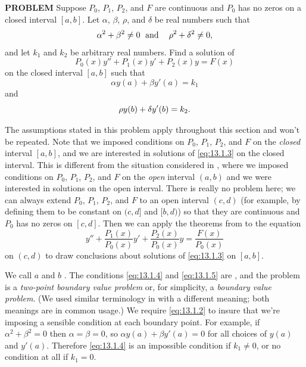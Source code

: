 {\bfseries PROBLEM}\quad
Suppose $P_{0}$, $P_{1}$, $P_{2}$, and $F$ are  continuous and  $P_{0}$
has no zeros on a closed interval $[a,b]$. Let $\alpha$, $\beta$,
$\rho$, and $\delta$ be real numbers such that
\begin{equation} \label{eq:13.1.2}
\alpha^{2}+\beta^{2}\ne 0\text{\;    and\; \;  } \rho^{2}+\delta^{2}\ne 0,
\end{equation}
and let $k_{1}$ and $k_{2}$ be arbitrary real numbers. Find a solution of
\begin{equation} \label{eq:13.1.3}
P_{0}(x)y''+P_{1}(x)y'+P_{2}(x)y=F(x)
\end{equation}
on the closed interval $[a,b]$ such that
\begin{equation} \label{eq:13.1.4}
\alpha y(a)+\beta y'(a)=k_{1}
\end{equation}
and
\begin{equation} \label{eq:13.1.5}
\rho y(b)+\delta y'(b)=k_{2}.\index{second order equation!two-point boundary value problem!defined}\index{two-point boundary value problem!defined}
\end{equation}


\medskip
The
assumptions
stated in this problem apply throughout this section and
won't be repeated. Note that we imposed conditions on $P_{0}$,
$P_{1}$, $P_{2}$, and $F$  on the \emph{closed} interval $[a,b]$, and we
are interested in solutions of \eqref{eq:13.1.3} on the closed interval.
This is different from the situation considered in ,
where we imposed conditions on $P_{0}$, $P_{1}$, $P_{2}$, and $F$  on the
\emph{open} interval $(a,b)$ and we were interested in solutions on the
open interval. There
is really no problem here;   we can always extend  $P_{0}$, $P_{1}$,
$P_{2}$,
and $F$ to an open interval $(c,d)$ (for example, by defining them to be
constant on $(c,d]$ and $[b,d)$) so that they are continuous and $P_{0}$
has no zeros on $[c,d]$. Then we can apply the theorems from
 to the equation
\[
y''+\frac{P_{1}(x)}{P_{0}(x)}y'+
\frac{P_{2}(x)}{P_{0}(x)}y=\frac{F(x)}{P_{0}(x)}
\]
on $(c,d)$ to draw conclusions about solutions of \eqref{eq:13.1.3} on $[a,b]$.

We call $a$ and $b$ .  The conditions \eqref{eq:13.1.4}
and \eqref{eq:13.1.5}  are
,
and the problem is a
\emph{two-point boundary value problem} or, for simplicity, a
\emph{boundary value problem}. (We used  similar terminology in
 with a different meaning; both meanings are in common usage.)
  We require \eqref{eq:13.1.2} to insure that we're imposing a sensible
condition at each boundary point. For example, if $\alpha^{2}+\beta^{2}=0$
then $\alpha=\beta=0$, so $\alpha y(a)+\beta y'(a)=0$ for all choices of
$y(a)$ and $y'(a)$. Therefore  \eqref{eq:13.1.4} is an impossible condition if
$k_{1}\ne0$, or no condition at all if $k_{1}=0$.

